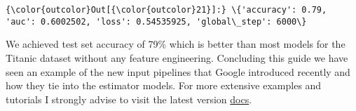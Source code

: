 \documentclass[11pt]{article}
\begin{document}
\begin{Verbatim}[commandchars=\\\{\}]
{\color{outcolor}Out[{\color{outcolor}21}]:} \{'accuracy': 0.79, 'auc': 0.6002502, 'loss': 0.54535925, 'global\_step': 6000\}
\end{Verbatim}
            
    We achieved test set accuracy of 79\% which is better than most models
for the Titanic dataset without any feature engineering. Concluding this
guide we have seen an example of the new input pipelines that Google
introduced recently and how they tie into the estimator models. For more
extensive examples and tutorials I strongly advise to visit the latest
version \href{https://www.tensorflow.org/get_started/}{docs}.


    
    
    
    
\end{document}
